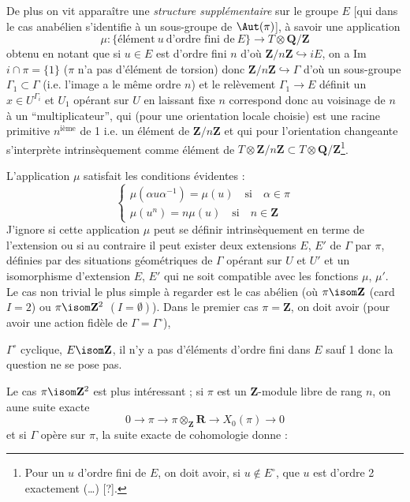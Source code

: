 De plus on vit apparaître une \emph{structure supplémentaire} sur le groupe $E$ [qui dans le cas anabélien s'identifie à un sous-groupe de $\Aut (\pi)$], à savoir une application
$$
\mu: \{ \text{élément}~u~\text{d'ordre fini de}~E \} \to T \otimes \mathbf{Q}/\mathbf{Z}
$$
obtenu en notant que si $u \in E$ est d'ordre fini $n$ d'où $\mathbf{Z}/n\mathbf{Z} \hookrightarrow{i} E$, on a Im $i \cap \pi = \{ 1 \}$ ($\pi$ n'a pas d'élément de torsion) donc $\mathbf{Z}/n\mathbf{Z} \hookrightarrow \Gamma$ d'où un sous-groupe $\Gamma_1 \subset  \Gamma$ (i.e. l'image a le même ordre $n$) et le relèvement $\Gamma_1 \to E$ définit un $x \in U^{\Gamma_i}$ et $U_1$ opérant sur $U$ en laissant fixe $n$ correspond donc au voisinage de $n$ à un ``multiplicateur'', qui (pour une orientation locale choisie) est une racine primitive $n^{\text{ième}}$ de 1 i.e. un élément de $\mathbf{Z}/n \mathbf{Z}$ et qui pour l'orientation changeante s'interprète intrinsèquement comme élément de $T \otimes \mathbf{Z}/n\mathbf{Z} \subset  T \otimes \mathbf{Q}/\mathbf{Z}$\footnote{Pour un $u$ d'ordre fini de $E$, on doit avoir, si $u \notin E^\circ$, que $u$ est d'ordre 2 exactement (\dots) [?].}.

L'application $\mu$ satisfait les conditions évidentes :
$$
\begin{cases}
\mu (\alpha u \alpha^{-1}) = \mu (u) \quad \text{si} \quad \alpha \in \pi \\
\mu (u^n) = n \mu(u) \quad \text{si} \quad n \in \mathbf{Z}
\end{cases}
$$
J'ignore si cette application $\mu$ peut se définir intrinsèquement en terme de l'extension ou si au contraire il peut exister deux extensions $E$, $E'$ de $\Gamma$ par $\pi$, définies par des situations géométriques de $\Gamma$ opérant sur $U$ et $U'$ et un isomorphisme d'extension $E$, $E'$ qui ne soit compatible avec les fonctions $\mu$, $\mu'$. Le cas non trivial le plus simple à regarder est le cas abélien (où $\pi \isom \mathbf{Z}$ (card $I = 2$) ou $\pi \isom \mathbf{Z}^2$ $(I = \emptyset)$). Dans le premier cas $\pi = \mathbf{Z}$, on doit avoir (pour avoir une action fidèle de $\Gamma = \Gamma^\circ$), 

$\Gamma^\circ$ cyclique, $E \isom \mathbf{Z}$, il n'y a pas d'éléments d'ordre fini dans $E$ sauf 1 donc la question ne se pose pas.

Le cas $\pi \isom \mathbf{Z}^2$ est plus intéressant ;  si $\pi$ est un $\mathbf{Z}$-module libre de rang $n$, on aune suite exacte
$$
0 \to \pi \to \pi \otimes_{\mathbf{Z}} \mathbf{R} \to X_0 (\pi) \to 0
$$
et si $\Gamma$ opère sur $\pi$, la suite exacte de cohomologie donne :

